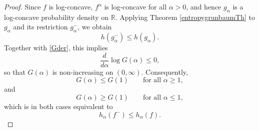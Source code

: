 \documentclass[10pt,a4paper]{amsart}
\begin{document}
\begin{proof}
Since $f$ is log-concave, $f^\alpha$ is log-concave for all $\alpha> 0$, and hence $g_\alpha$ is a log-concave probability density on $\mathbb R$.  
Applying Theorem \ref{entropygrunbaumTh} to $g_\alpha$ and its restriction $g_\alpha^-$, we obtain
\[
h(g_\alpha^-)\le h(g_\alpha).
\]
Together with \eqref{Gder}, this implies
\[
\frac{d}{d\alpha}\log G(\alpha)\le 0,
\]
so that $G(\alpha)$ is non-increasing on $(0,\infty)$.
Consequently,
\[
G(\alpha)\le G(1)\qquad\text{for all }\alpha\ge 1,
\]
and 
\[
G(\alpha)\geq G(1)\qquad\text{for all }\alpha\leq 1,
\]
which is in both cases equivalent to
\[
h_\alpha(f^-)\le h_\alpha(f).
\]
\end{proof}
\end{document}
